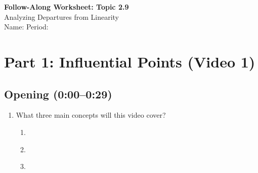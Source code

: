 \documentclass[11pt]{article}
\begin{document}
\begin{center}
{\Large \textbf{Follow-Along Worksheet: Topic 2.9}}\\[0.5em]
{\large Analyzing Departures from Linearity}\\[1em]
Name: \underline{\hspace{3in}} \quad Period: \underline{\hspace{1in}}
\end{center}

\section*{Part 1: Influential Points (Video 1)}

\subsection*{Opening (0:00--0:29)}
\begin{enumerate}[label=\arabic*.]
\item What three main concepts will this video cover?
\begin{enumerate}[label=\alph*)]
\item \underline{\hspace{3.5in}}
\item \underline{\hspace{3.5in}}
\item \underline{\hspace{3.5in}}
\end{enumerate}
\end{enumerate}
\end{document}
